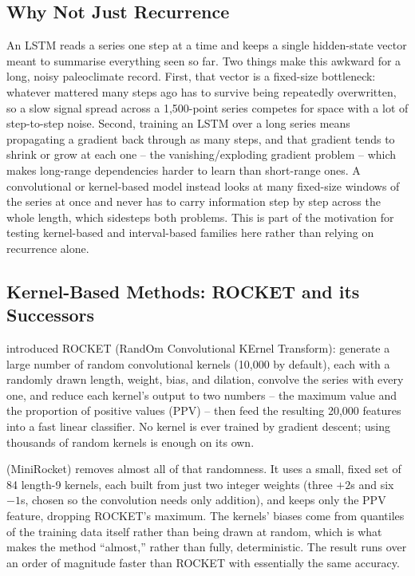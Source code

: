 \subsection{Why Not Just Recurrence}
An LSTM reads a series one step at a time and keeps a single hidden-state vector meant to summarise everything seen so far. Two things make this awkward for a long, noisy paleoclimate record. First, that vector is a fixed-size bottleneck: whatever mattered many steps ago has to survive being repeatedly overwritten, so a slow signal spread across a 1,500-point series competes for space with a lot of step-to-step noise. Second, training an LSTM over a long series means propagating a gradient back through as many steps, and that gradient tends to shrink or grow at each one -- the vanishing/exploding gradient problem -- which makes long-range dependencies harder to learn than short-range ones. A convolutional or kernel-based model instead looks at many fixed-size windows of the series at once and never has to carry information step by step across the whole length, which sidesteps both problems. This is part of the motivation for testing kernel-based and interval-based families here rather than relying on recurrence alone.

\subsection{Kernel-Based Methods: ROCKET and its Successors}
\citet{dempster2020} introduced ROCKET (RandOm Convolutional KErnel Transform): generate a large number of random convolutional kernels (10{,}000 by default), each with a randomly drawn length, weight, bias, and dilation, convolve the series with every one, and reduce each kernel's output to two numbers -- the maximum value and the proportion of positive values (PPV) -- then feed the resulting 20{,}000 features into a fast linear classifier. No kernel is ever trained by gradient descent; using thousands of random kernels is enough on its own.

\citet{dempster2021minirocket} (MiniRocket) removes almost all of that randomness. It uses a small, fixed set of 84 length-9 kernels, each built from just two integer weights (three $+2$s and six $-1$s, chosen so the convolution needs only addition), and keeps only the PPV feature, dropping ROCKET's maximum. The kernels' biases come from quantiles of the training data itself rather than being drawn at random, which is what makes the method ``almost,'' rather than fully, deterministic. The result runs over an order of magnitude faster than ROCKET with essentially the same accuracy.

